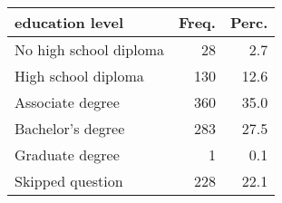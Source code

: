\begin{table}[ht]
\centering
\begin{tabular}{lrr}
  \hline
education level & Freq. & Perc. \\ 
  \hline
No high school diploma & 28 & 2.7 \\ 
  High school diploma & 130 & 12.6 \\ 
  Associate degree & 360 & 35.0 \\ 
  Bachelor's degree & 283 & 27.5 \\ 
  Graduate degree &  1 & 0.1 \\ 
  Skipped question & 228 & 22.1 \\ 
   \hline
\end{tabular}
\end{table}

